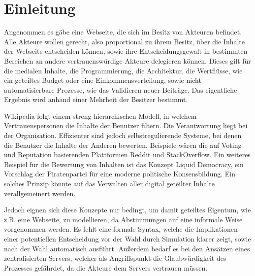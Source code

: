 \documentclass[a4paper,12pt]{report}
\begin{document}



% 


\newpage
\tableofcontents





\newpage

\chapter{Einleitung}

Angenommen es gäbe eine Webseite, die sich im Besitz von Akteuren befindet. Alle Akteure wollen gerecht, also proportional zu ihrem Besitz, über die Inhalte der Webseite entscheiden können, sowie ihre Entscheidungsgewalt in bestimmten Bereichen an andere vertrauenswürdige Akteure delegieren können. Dieses gilt für die medialen Inhalte, die Programmierung, die Architektur, die Wertflüsse, wie ein geteiltes Budget oder eine Einkommensverteilung, sowie nicht automatisierbare Prozesse, wie das Validieren neuer Beiträge. Das eigentliche Ergebnis wird anhand einer Mehrheit der Besitzer bestimmt.

Wikipedia folgt einem streng hierarchischen Modell, in welchem Vertrauenspersonen die Inhalte der Benutzer filtern. Die Verantwortung liegt bei der Organisation.
Effizienter sind jedoch selbstregulierende Systeme, bei denen die Benutzer die Inhalte der Anderen bewerten. Beispiele wären die auf Voting und Reputation basierenden Plattformen Reddit und StackOverflow.
Ein weiteres Beispiel für die Bewertung von Inhalten ist das Konzept 
Liquid Democracy\cite{Lindenberg2010}, ein Vorschlag der Piratenpartei für eine moderne politische Konsensbildung.
Ein solches Prinzip könnte auf das Verwalten aller digital geteilter Inhalte verallgemeinert werden.

Jedoch eignen sich diese Konzepte nur bedingt, um damit geteiltes Eigentum, wie z.B. eine Webseite, zu modellieren, da Abstimmungen auf eine informale Weise vorgenommen werden. Es fehlt eine formale Syntax, welche die Implikationen einer potentiellen Entscheidung vor der Wahl durch Simulation klarer zeigt, sowie nach der Wahl automatisch ausführt.
Außerdem bedarf es bei den Ansätzen eines zentralisierten Servers, welcher als Angriffspunkt die Glaubwürdigkeit des Prozesses gefährdet, da die Akteure dem Servers vertrauen müssen. 
\end{document}
